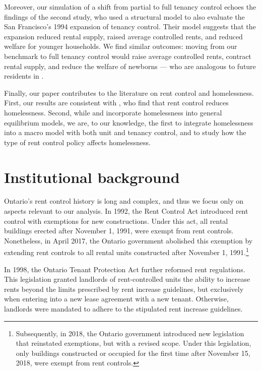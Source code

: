 \documentclass[parskip=full]{article}
\begin{document}
Moreover, our simulation of a shift from partial to full tenancy control echoes the findings of the second \citet{dmq-2019} study, who used a structural model to also evaluate the San Francisco’s 1994 expansion of tenancy control. Their model suggests that the expansion reduced rental supply, raised average controlled rents, and reduced welfare for younger households. We find similar outcomes: moving from our benchmark to full tenancy control would raise average controlled rents, contract rental supply, and reduce the welfare of newborns — who are analogous to future residents in \citet{dmq-2019}.

Finally, our paper contributes to the literature on rent control and homelessness. First, our results are consistent with \citet{eo-1998}, who find that rent control reduces homelessness. Second, while \citet{az-2024} and \citet{abramson-2024} incorporate homelessness into general equilibrium models, we are, to our knowledge, the first to integrate homelessness into a macro model with both unit and tenancy control, and to study how the type of rent control policy affects homelessness.

\section{Institutional background}\label{sec:insitutional_background}

Ontario's rent control history is long and complex, and thus we focus only on aspects relevant to our analysis. In 1992, the Rent Control Act introduced rent control with exemptions for new constructions. Under this act, all rental buildings erected after November 1, 1991, were exempt from rent controls. Nonetheless, in April 2017, the Ontario government abolished this exemption by extending rent controls to all rental units constructed after November 1, 1991.\footnote{Subsequently, in 2018, the Ontario government introduced new legislation that reinstated exemptions, but with a revised scope. Under this legislation, only buildings constructed or occupied for the first time after November 15, 2018, were exempt from rent controls.}

In 1998, the Ontario Tenant Protection Act further reformed rent regulations. This legislation granted landlords of rent-controlled units the ability to increase rents beyond the limits prescribed by rent increase guidelines, but exclusively when entering into a new lease agreement with a new tenant. Otherwise, landlords were mandated to adhere to the stipulated rent increase guidelines. 
\end{document}
